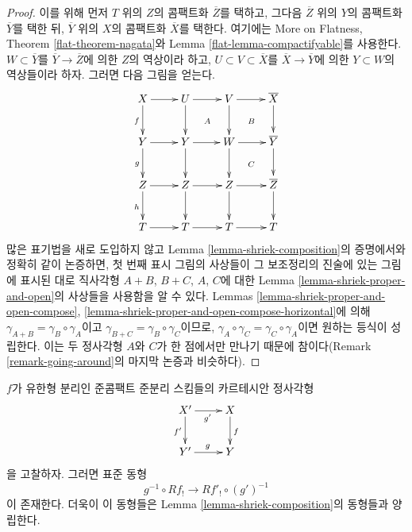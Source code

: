 \begin{proof}
이를 위해 먼저 $T$ 위의 $Z$의 콤팩트화 $\overline{Z}$를 택하고,
그다음 $\overline{Z}$ 위의 $Y$의 콤팩트화 $\overline{Y}$를 택한 뒤,
$\overline{Y}$ 위의 $X$의 콤팩트화 $\overline{X}$를 택한다.
여기에는 More on Flatness, Theorem \ref{flat-theorem-nagata}와
Lemma \ref{flat-lemma-compactifyable}를 사용한다.
$W \subset \overline{Y}$를
$\overline{Y} \to \overline{Z}$에 의한 $Z$의 역상이라 하고,
$U \subset V \subset \overline{X}$를
$\overline{X} \to \overline{Y}$에 의한 $Y \subset W$의 역상들이라
하자. 그러면 다음 그림을 얻는다.
$$
\xymatrix{
X \ar[d]_f \ar[r] & U \ar[r] \ar[d] \ar@{}[dr]|A &
V \ar[d] \ar[r] \ar@{}[rd]|B & \overline{X} \ar[d] \\
Y \ar[d]_g \ar[r] & Y \ar[r] \ar[d] & W \ar[r] \ar[d] \ar@{}[rd]|C &
\overline{Y} \ar[d] \\
Z \ar[d]_h \ar[r] & Z \ar[d] \ar[r] & Z \ar[d] \ar[r] & \overline{Z} \ar[d] \\
T \ar[r] & T \ar[r] & T \ar[r] & T
}
$$
많은 표기법을 새로 도입하지 않고 Lemma
\ref{lemma-shriek-composition}의 증명에서와 정확히 같이 논증하면,
첫 번째 표시 그림의 사상들이 그 보조정리의 진술에 있는 그림에
표시된 대로 직사각형 $A + B$, $B + C$, $A$, $C$에 대한 Lemma
\ref{lemma-shriek-proper-and-open}의 사상들을 사용함을 알 수 있다.
Lemmas \ref{lemma-shriek-proper-and-open-compose},
\ref{lemma-shriek-proper-and-open-compose-horizontal}에 의해
$\gamma_{A + B} = \gamma_B \circ \gamma_A$이고
$\gamma_{B + C} = \gamma_B \circ \gamma_C$이므로,
$\gamma_A \circ \gamma_C = \gamma_C \circ \gamma_A$이면 원하는
등식이 성립한다. 이는 두 정사각형 $A$와 $C$가 한 점에서만 만나기
때문에 참이다(Remark \ref{remark-going-around}의 마지막 논증과
비슷하다).
\end{proof}

\begin{lemma}
\label{lemma-base-change-shriek}
$f$가 유한형 분리인 준콤팩트 준분리 스킴들의 카르테시안 정사각형
$$
\xymatrix{
X' \ar[r]_{g'} \ar[d]_{f'} & X \ar[d]^f \\
Y' \ar[r]^g & Y
}
$$
을 고찰하자. 그러면 표준 동형
$$
g^{-1} \circ Rf_! \to Rf'_! \circ (g')^{-1}
$$
이 존재한다. 더욱이 이 동형들은 Lemma
\ref{lemma-shriek-composition}의 동형들과 양립한다.
\end{lemma}

